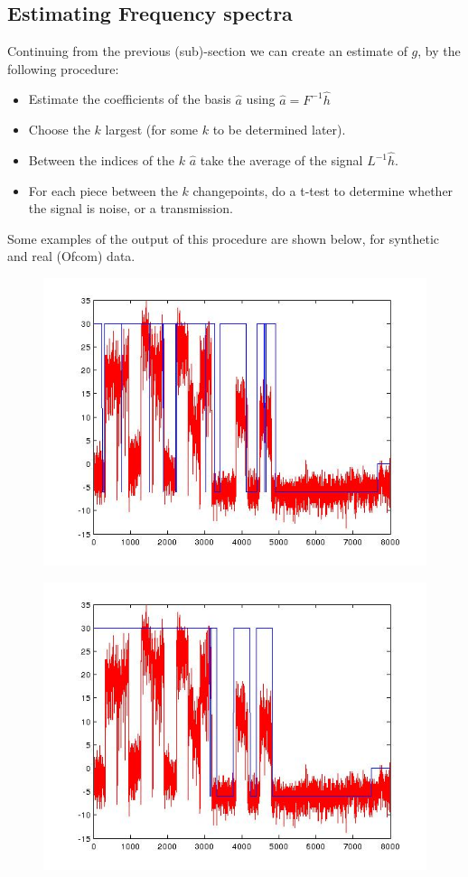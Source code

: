 \documentclass{article}
\begin{document}
\subsection{Estimating Frequency spectra}

Continuing from the previous (sub)-section we can create an estimate of \(g\), by the following procedure:

\begin{itemize}
\item Estimate the coefficients of the basis \(\hat{a}\) using \(\hat{a} = F^{-1} \hat{h}\)
\item Choose the \(k\) largest (for some \(k\) to be determined later).
\item Between the indices of the \(k\) \(\hat{a}\) take the average of the signal \(L^{-1}\hat{h}\).
\item For each piece between the \(k\) changepoints, do a t-test to determine whether the signal is noise, or a transmission.
\end{itemize}

Some examples of the output of this procedure are shown below, for synthetic and real (Ofcom) data.


\begin{figure}[h]
\centering
\includegraphics[height = 7.3 cm]{ofcom_classification.jpg}
\caption{}
\label{fig:hvb}
\end{figure}

\begin{figure}[h]
\centering
\includegraphics[height = 7.3 cm]{ofcom_classification1.jpg}
\caption{}
\label{fig:hvb}
\end{figure}
\end{document}
